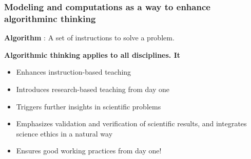 \documentclass{beamer}
\begin{document}
\begin{frame}
\frametitle{Modeling and computations as a way to enhance algorithminc thinking}

\begin{block}{}
\textbf{Algorithm} :
A set of instructions to solve a problem.
\end{block}

\begin{block}{}
\textbf{Algorithmic thinking applies to all disciplines. It}
\begin{itemize}
\item Enhances instruction-based teaching

\item Introduces research-based teaching  from day one

\item Triggers further insights in scientific problems

\item Emphasizes validation and verification of scientific results, and integrates science ethics in a natural way

\item Ensures good working practices from day one!
\end{itemize}

\noindent
\end{block}
\end{frame}
\end{document}
